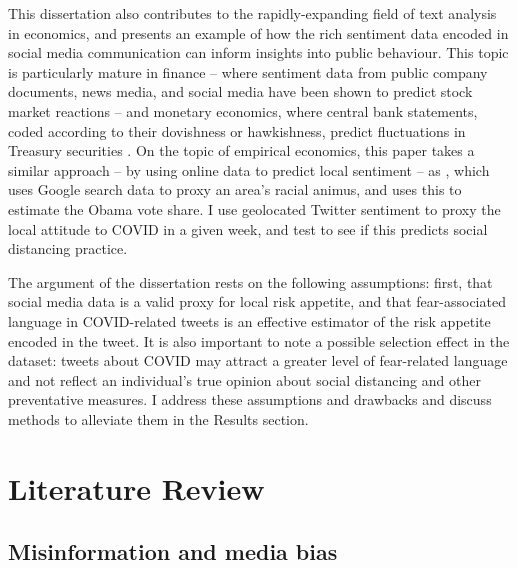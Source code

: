 \documentclass{article}
\begin{document}

This dissertation also contributes to the rapidly-expanding field of text analysis in economics, and presents an example of how the rich sentiment data encoded in social media communication can inform insights into public behaviour. This topic is particularly mature in finance -- where sentiment data from public company documents, news media, and social media have been shown to predict stock market reactions \parencite{bollenTwitterMoodPredicts2011} -- and monetary economics, where central bank statements, coded according to their dovishness or hawkishness, predict fluctuations in Treasury securities \parencite{luccaMeasuringCentralBank2009,gentzkowTextData2019}. On the topic of empirical economics, this paper takes a similar approach -- by using online data to predict local sentiment -- as \textcite{stephens-davidowitzCostRacialAnimus2014}, which uses Google search data to proxy an area's racial animus, and uses this to estimate the Obama vote share. I use geolocated Twitter sentiment to proxy the local attitude to COVID in a given week, and test to see if this predicts social distancing practice. 

The argument of the dissertation rests on the following assumptions: first, that social media data is a valid proxy for local risk appetite, and that fear-associated language in COVID-related tweets is an effective estimator of the risk appetite encoded in the tweet. It is also important to note a possible selection effect in the dataset: tweets about COVID may attract a greater level of fear-related language and not reflect an individual's true opinion about social distancing and other preventative measures. I address these assumptions and drawbacks and discuss methods to alleviate them in the Results section.

\section{Literature Review}
\subsection{Misinformation and media bias}
\end{document}
